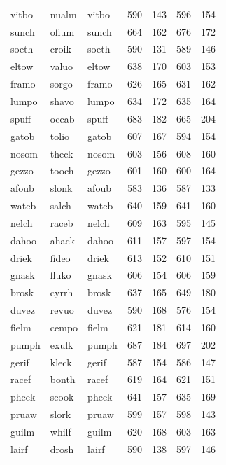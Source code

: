 \documentclass[
]{interact}
\begin{document}
\begin{table}
\begin{tabular*}{\linewidth}{@{\extracolsep{\fill}}lllrrrr}
vitbo & nualm & vitbo & 590 & 143 & 596 & 154 \\ 
sunch & ofium & sunch & 664 & 162 & 676 & 172 \\ 
soeth & croik & soeth & 590 & 131 & 589 & 146 \\ 
eltow & valuo & eltow & 638 & 170 & 603 & 153 \\ 
framo & sorgo & framo & 626 & 165 & 631 & 162 \\ 
lumpo & shavo & lumpo & 634 & 172 & 635 & 164 \\ 
spuff & oceab & spuff & 683 & 182 & 665 & 204 \\ 
gatob & tolio & gatob & 607 & 167 & 594 & 154 \\ 
nosom & theck & nosom & 603 & 156 & 608 & 160 \\ 
gezzo & tooch & gezzo & 601 & 160 & 600 & 164 \\ 
afoub & slonk & afoub & 583 & 136 & 587 & 133 \\ 
wateb & salch & wateb & 640 & 159 & 641 & 160 \\ 
nelch & raceb & nelch & 609 & 163 & 595 & 145 \\ 
dahoo & ahack & dahoo & 611 & 157 & 597 & 154 \\ 
driek & fideo & driek & 613 & 152 & 610 & 151 \\ 
gnask & fluko & gnask & 606 & 154 & 606 & 159 \\ 
brosk & cyrrh & brosk & 637 & 165 & 649 & 180 \\ 
duvez & revuo & duvez & 590 & 168 & 576 & 154 \\ 
fielm & cempo & fielm & 621 & 181 & 614 & 160 \\ 
pumph & exulk & pumph & 687 & 184 & 697 & 202 \\ 
gerif & kleck & gerif & 587 & 154 & 586 & 147 \\ 
racef & bonth & racef & 619 & 164 & 621 & 151 \\ 
pheek & scook & pheek & 641 & 157 & 635 & 169 \\ 
pruaw & slork & pruaw & 599 & 157 & 598 & 143 \\ 
guilm & whilf & guilm & 620 & 168 & 603 & 163 \\ 
lairf & drosh & lairf & 590 & 138 & 597 & 146 \\ 
\bottomrule
\end{tabular*}
\end{table}
\end{document}
